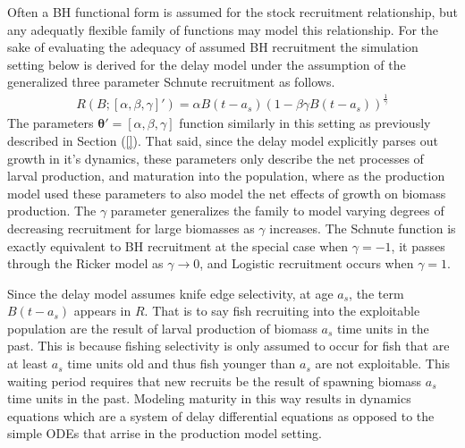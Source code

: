 %
Often a BH functional form is assumed for the stock recruitment relationship, but any adequatly
flexible family of functions may model this relationship. For the sake of evaluating the adequacy
of assumed BH recruitment the simulation setting below is derived for the delay model under the
assumption of the generalized three parameter Schnute recruitment as follows.
%
\begin{align}
R(B;[\alpha, \beta, \gamma]') = \alpha B(t-a_s)(1-\beta\gamma B(t-a_s))^{\frac{1}{\gamma}} \label{srr}
\end{align}
%
The parameters $\bm{\theta}'=[\alpha, \beta, \gamma]$ %
function similarly in this setting as previously described in Section (\ref{}).
That said, since the delay model explicitly parses out growth in it's dynamics,
these parameters only describe the net processes of larval production, and maturation
into the population, where as the production model used these parameters to
also model the net effects of growth on biomass production. %
The $\gamma$ parameter generalizes the family to model varying degrees of
decreasing recruitment for large biomasses as $\gamma$ increases. The Schnute
function is exactly equivalent to BH recruitment at the special case when
$\gamma=-1$, it passes through the Ricker model as $\gamma\rightarrow0$, and
Logistic recruitment occurs when $\gamma=1$.

%
Since the delay model assumes knife edge selectivity, at age $a_s$, the term
$B(t-a_s)$ appears in $R$. That is to say fish recruiting into the exploitable
population are the result of larval production of biomass $a_s$ time
units in the past. This is because fishing selectivity is only assumed to occur
for fish that are at least $a_s$ time units old and thus fish younger than $a_s$
are not exploitable. This waiting period requires that new recruits be the
result of spawning biomass $a_s$ time units in the past. Modeling maturity in
this way results in dynamics equations which are a system of delay differential
equations as opposed to the simple ODEs that arrise in the production model
setting.

